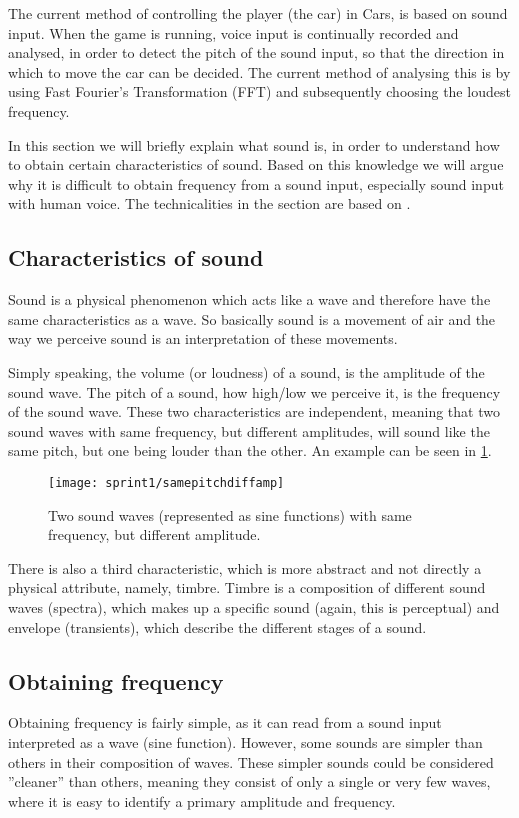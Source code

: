 The current method of controlling the player (the car) in Cars, is based on sound input.
When the game is running, voice input is continually recorded and analysed, in order to detect the pitch of the sound input, so that the direction in which to move the car can be decided.
The current method of analysing this is by using Fast Fourier's Transformation (FFT) and subsequently choosing the loudest frequency.

In this section we will briefly explain what sound is, in order to understand how to obtain certain characteristics of sound.
Based on this knowledge we will argue why it is difficult to obtain frequency from a sound input, especially sound input with human voice.
The technicalities in the section are based on \cite{music-and-computers}.

\subsection{Characteristics of sound}
Sound is a physical phenomenon which acts like a wave and therefore have the same characteristics as a wave.
So basically sound is a movement of air and the way we perceive sound is an interpretation of these movements.

Simply speaking, the volume (or loudness) of a sound, is the amplitude of the sound wave.
The pitch of a sound, how high/low we perceive it, is the frequency of the sound wave.
These two characteristics are independent, meaning that two sound waves with same frequency, but different amplitudes, will sound like the same pitch, but one being louder than the other.
An example can be seen in \cref{fig:samepitchdiffamp}.

\begin{figure}[h]
\centering
\texttt{[image: sprint1/samepitchdiffamp]}
\caption{Two sound waves (represented as sine functions) with same frequency, but different amplitude.}
\label{fig:samepitchdiffamp}
\end{figure}

There is also a third characteristic, which is more abstract and not directly a physical attribute, namely, timbre.
Timbre is a composition of different sound waves (spectra), which makes up a specific sound (again, this is perceptual) and envelope (transients), which describe the different stages of a sound.

\subsection{Obtaining frequency}
Obtaining frequency is fairly simple, as it can read from a sound input interpreted as a wave (sine function).
However, some sounds are simpler than others in their composition of waves.
These simpler sounds could be considered ''cleaner'' than others, meaning they consist of only a single or very few waves, where it is easy to identify a primary amplitude and frequency.

